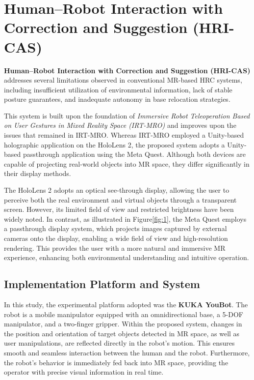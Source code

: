 \documentclass[../../main.tex]{subfiles} %
\begin{document}
\section{Human–Robot Interaction with Correction and Suggestion (HRI-CAS)}

\textbf{Human–Robot Interaction with Correction and Suggestion (HRI-CAS)} 
addresses several limitations observed in conventional MR-based HRC systems, 
including insufficient utilization of environmental information, 
lack of stable posture guarantees, 
and inadequate autonomy in base relocation strategies.

This system is built upon the foundation of 
\textit{Immersive Robot Teleoperation Based on User Gestures in Mixed Reality Space (IRT-MRO)} 
and improves upon the issues that remained in IRT-MRO.  
Whereas IRT-MRO employed a Unity-based holographic application on the HoloLens 2, 
the proposed system adopts a Unity-based passthrough application using the Meta Quest.  
Although both devices are capable of projecting real-world objects into MR space, 
they differ significantly in their display methods.  

The HoloLens 2 adopts an optical see-through display, 
allowing the user to perceive both the real environment and virtual objects through a transparent screen.  
However, its limited field of view and restricted brightness have been widely noted.  
In contrast, as illustrated in Figure\ref{fig:1}, the Meta Quest employs a passthrough display system, 
which projects images captured by external cameras onto the display, 
enabling a wide field of view and high-resolution rendering.  
This provides the user with a more natural and immersive MR experience, 
enhancing both environmental understanding and intuitive operation.

\subsection{Implementation Platform and System}
In this study, the experimental platform adopted was the \textbf{KUKA YouBot}.  
The robot is a mobile manipulator equipped with an omnidirectional base, 
a 5-DOF manipulator, and a two-finger gripper.  
Within the proposed system, changes in the position and orientation of target objects 
detected in MR space, as well as user manipulations, 
are reflected directly in the robot’s motion.  
This ensures smooth and seamless interaction between the human and the robot.  
Furthermore, the robot’s behavior is immediately fed back into MR space, 
providing the operator with precise visual information in real time.
\end{document}
